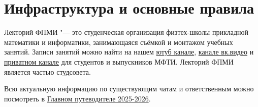 \section{Инфраструктура и основные правила}\label{sec:infrastructure}

Лекторий ФПМИ "--- это студенческая организация физтех-школы прикладной математики и информатики, занимающаяся съёмкой и монтажом учебных занятий. Записи занятий можно найти на нашем \href{https://www.youtube.com/channel/UCdxesVp6Fs7wLpnp1XKkvZg}{ютуб канале}, \href{https://vkvideo.ru/@lectorium_fpmi}{канале вк.видео} и \href{https://vk.com/lectorium_fpmi_only}{приватном канале} для студентов и выпускников МФТИ. Лекторий ФПМИ является частью студсовета.

Всю актуальную информацию по существующим чатам и ответственным можно посмотреть в \href{https://docs.google.com/document/d/1bmDp8uhcznhxUGm7qg65EBLoIcyMhVX3fKXMk5wG9yk}{Главном путеводителе 2025-2026}.






